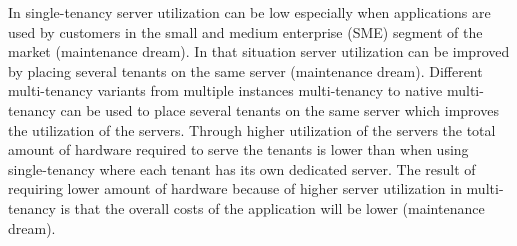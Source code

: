 \documentclass[conference]{sasmoota2017}
\begin{document}
In single-tenancy server utilization can be low especially when applications are used by customers in the small and medium enterprise (SME) segment of the market (maintenance dream). In that situation server utilization can be improved by placing several tenants on the same server (maintenance dream). Different multi-tenancy variants from multiple instances multi-tenancy to native multi-tenancy can be used to place several tenants on the same server which improves the utilization of the servers. Through higher utilization of the servers the total amount of hardware required to serve the tenants is lower than when using single-tenancy where each tenant has its own dedicated server. The result of requiring lower amount of hardware because of higher server utilization in multi-tenancy is that the overall costs of the application will be lower (maintenance dream).
\end{document}

